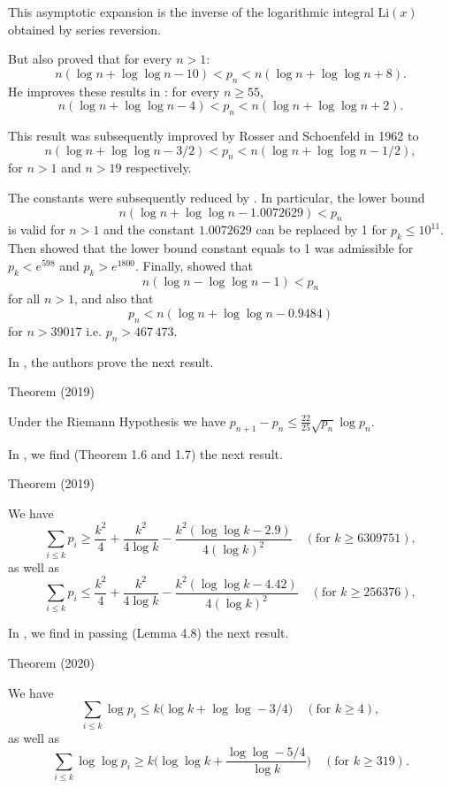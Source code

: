 This asymptotic expansion is the inverse of the logarithmic integral
$\mbox{Li}(x)$ obtained by series reversion. 


 But
\cite{Rosser*38}
also proved  that for every $n> 1$:
$$
n (\log n + \log \log n - 10) < p_n < n (\log n + \log\log n +8).
$$
He improves these results in
\cite{Rosser*41}
:  for every $n\geq 55$,
$$
n (\log n + \log \log n - 4) < p_n < n (\log n + \log\log n +2).
$$

 This result was subsequently improved by Rosser and Schoenfeld
\cite{Rosser-Schoenfeld*62}
 in 1962 to
$$
n (\log n + \log \log n - 3/2) < p_n < n (\log n + \log\log n -1/2),
$$
for $n > 1$ and $n > 19$  respectively.

The constants  were subsequently reduced by
\cite{Robin*83-1}.
In particular, the lower bound 
$$
n (\log n + \log \log n - 1.0072629) < p_n
$$
is valid for $n>1$ and the constant $1.0072629$ can be replaced by 1 for
$p_k\leq 10^{11}$.
Then 
\cite{Massias-Robin*96}
  showed that the lower bound constant equals to 1 was admissible for
$p_k < e^{598}$
and $p_k > e^{1800}$. Finally,  
\cite{Dusart*99-2}
showed
that
$$
  n(\log n - \log \log n - 1) < p_n
$$ for all $n > 1$, and also that
$$
p_n < n (\log n + \log\log n - 0.9484)
$$ for $n > 39017$ i.e. $p_n > 467\,473$.

In
\cite{Carneiro-Milinovich-Soundararajan*19},
the authors  prove the next result.
\begin{thm}{Theorem (2019)}

Under the Riemann Hypothesis we have $p_{n+1}-p_n\le\frac{22}{25}\sqrt{p_n}\log p_n$.
\end{thm}


\par 
\par 
In 
\cite{Axler*19},
we find (Theorem 1.6 and 1.7) the next result.
\par 
\begin{thm}{Theorem (2019)}

  We have
  $$
  \sum_{i\le k}p_i\ge
  \frac{k^2}4 +\frac{k^2}{4\log k}
  -\frac{k^2(\log\log k-2.9)}{4(\log k)^2}\quad(\text{for $k\ge 6309751$}),
  $$
  as well as
  $$
  \sum_{i\le k}p_i\le
  \frac{k^2}4 +\frac{k^2}{4\log k}
  -\frac{k^2(\log\log k-4.42)}{4(\log k)^2}\quad(\text{for $k\ge 256376$}),
  $$
\end{thm}


\par 
\par 
In 
\cite{DeKoninck-Letendre*20},
we find in passing (Lemma 4.8) the next result.
\par 
\begin{thm}{Theorem (2020)}

  We have
  $$
  \sum_{i\le k}\log p_i\le
  k\bigl(\log k+\log\log -3/4\Bigr)\quad(\text{for $k\ge 4$}),
  $$
  as well as
  $$
  \sum_{i\le k}\log\log p_i\ge
  k\biggl(\log\log k+\frac{\log\log -5/4}{\log k}\biggr)
  \quad(\text{for $k\ge319$}).
  $$
\end{thm}









